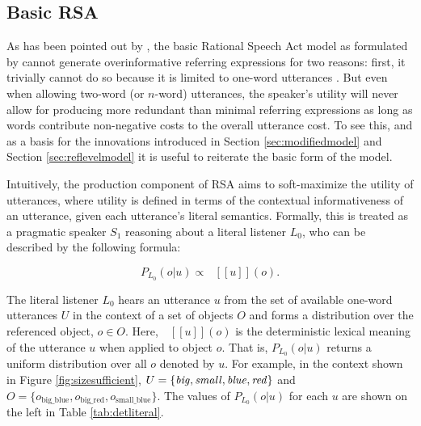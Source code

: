 \documentclass[11pt]{article}
\newcommand{\denote}[1]{\mbox{ $[\![ #1 ]\!]$}}
\newcommand{\tableref}[1]{Table \ref{#1}}
\newcommand{\figref}[1]{Figure \ref{#1}}
\newcommand{\sectionref}[1]{Section \ref{#1}}
\begin{document}
\subsection{Basic RSA}
\label{sec:basicrsa}

As has been pointed out by , the basic Rational Speech Act model as formulated by  cannot generate overinformative referring expressions for two reasons: first, it trivially cannot do so because it is limited to one-word utterances \cite<see also>{Baumann2014}. But even when allowing two-word (or $n$-word) utterances, the speaker's utility will never allow for producing more redundant than minimal referring expressions as long as words contribute non-negative costs to the overall utterance cost. To see this, and as a basis for the innovations introduced in \sectionref{sec:modifiedmodel} and \sectionref{sec:reflevelmodel} it is useful to reiterate the basic form of the model.

Intuitively, the production component of RSA aims to soft-maximize the utility of utterances, where utility is defined in terms of the contextual informativeness of an utterance, given each utterance's literal semantics. Formally, this is treated as a pragmatic speaker $S_1$ reasoning about a literal listener $L_0$, who can be described by the following formula:

\begin{equation}
P_{L_0}(o | u) \propto \denote{u}(o).
\end{equation}

The literal listener $L_0$ hears an utterance $u$ from the set of available one-word utterances $U$ in the context of a set of objects  $O$ and forms a distribution over the referenced object, $o \in O$. Here, $\denote{u}(o)$ is the deterministic lexical meaning of the utterance $u$ when applied to object $o$. That is, $P_{L_0}(o | u)$ returns a uniform distribution over all $o$ denoted by $u$. For example, in the context shown in \figref{fig:sizesufficient}, $U = \{\textrm{\emph{big}}, \textrm{\emph{small}}, \textrm{\emph{blue}}, \textrm{\emph{red}}\}$ and $O = \{o_{\textrm{big\_blue}}, o_{\textrm{big\_red}}, o_{\textrm{small\_blue}}\}$. The values of $P_{L_0}(o | u)$ for each $u$ are shown on the left in \tableref{tab:detliteral}.
\end{document}

